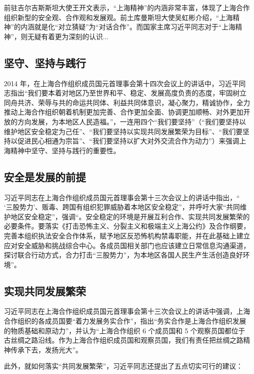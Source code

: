 \documentclass[12pt,titlepage]{ctexart}
\begin{document}
    前驻吉尔吉斯斯坦大使王开文表示，“上海精神”的内涵非常丰富，体现了上海合作组织新型的安全观、合作观和发展观。前土库曼斯坦大使吴虹彬介绍，“上海精神”的内涵就是化“对立猜疑”为“对话合作”\cite{sh-spirit-what-xi}。而国家主席习近平同志对于``上海精神''，则无疑有着更为深刻的认识...

    \subsection{坚守、坚持与践行}

    2014 年，在上海合作组织成员国元首理事会第十四次会议上的讲话中，习近平同志指出``我们要本着对地区乃至世界和平、稳定、发展高度负责的态度，牢固树立同舟共济、荣辱与共的命运共同体、利益共同体意识，凝心聚力，精诚协作，全力推动上海合作组织朝着机制更加完善、合作更加全面、协调更加顺畅、对外更加开放的方向发展，为本地区人民造福。''，一连用四个``我们要坚持''（``我们要坚持以维护地区安全稳定为己任''、``我们要坚持以实现共同发展繁荣为目标''、``我们要坚持以促进民心相通为宗旨''、``我们要坚持以扩大对外交流合作为动力''）来强调上海精神中坚守、坚持与践行的重要性\cite{xi-2014}。

    \subsection{安全是发展的前提}

    习近平同志在上海合作组织成员国元首理事会第十三次会议上的讲话中指出，`` `三股势力'、贩毒、跨国有组织犯罪威胁着本地区安全稳定''，并呼吁大家``共同维护地区安全稳定''，强调``。安全稳定的环境是开展互利合作、实现共同发展繁荣的必要条件。要落实《打击恐怖主义、分裂主义和极端主义上海公约》及合作纲要，完善本组织执法安全合作体系，赋予地区反恐怖机构禁毒职能，并在此基础上建立应对安全威胁和挑战综合中心。各成员国相关部门也应该建立日常信息沟通渠道，探讨联合行动方式，合力打击“三股势力”，为本地区各国人民生产生活创造良好环境''\cite{xi-2013}。

    \subsection{实现共同发展繁荣}

    习近平同志在上海合作组织成员国元首理事会第十三次会议上的讲话中强调，上海合作组织的各成员国要``着力发展务实合作''，指出``务实合作是上海合作组织发展的物质基础和原动力''，并认为``上海合作组织 6 个成员国和 5 个观察员国都位于古丝绸之路沿线。作为上海合作组织成员国和观察员国，我们有责任把丝绸之路精神传承下去，发扬光大''\cite{xi-2013}。

    此外，就如何落实``共同发展繁荣''，习近平同志还提出了五点切实可行的建议\cite{xi-2013}：
\end{document}

